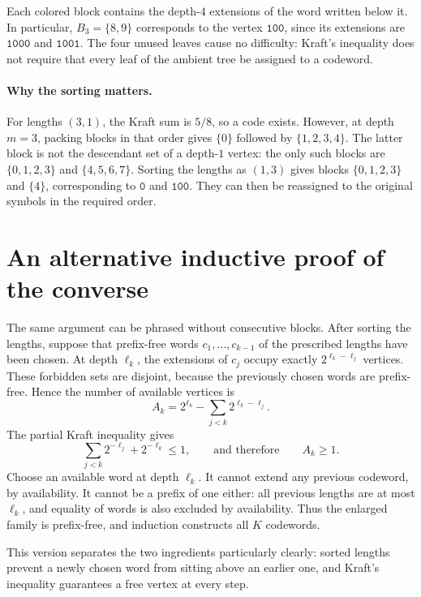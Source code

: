 \documentclass[11pt]{article}
\newcommand{\word}[1]{\texttt{#1}}
\begin{document}
Each colored block contains the depth-$4$ extensions of the word written
below it. In particular, $B_3=\{8,9\}$ corresponds to the vertex
$\word{100}$, since its extensions are $\word{1000}$ and $\word{1001}$.
The four unused leaves cause no difficulty: Kraft's inequality does not
require that every leaf of the ambient tree be assigned to a codeword.

\paragraph{Why the sorting matters.}
For lengths $(3,1)$, the Kraft sum is $5/8$, so a code exists. However, at
depth $m=3$, packing blocks in that order gives $\{0\}$ followed by
$\{1,2,3,4\}$. The latter block is not the descendant set of a depth-$1$
vertex: the only such blocks are $\{0,1,2,3\}$ and $\{4,5,6,7\}$.
Sorting the lengths as $(1,3)$ gives blocks $\{0,1,2,3\}$ and $\{4\}$,
corresponding to $\word{0}$ and $\word{100}$. They can then be reassigned
to the original symbols in the required order.

\section*{An alternative inductive proof of the converse}

The same argument can be phrased without consecutive blocks. After sorting
the lengths, suppose that prefix-free words $c_1,\ldots,c_{k-1}$ of the
prescribed lengths have been chosen. At depth $\ell_k$, the extensions of
$c_j$ occupy exactly $2^{\ell_k-\ell_j}$ vertices. These forbidden sets
are disjoint, because the previously chosen words are prefix-free. Hence
the number of available vertices is
\[
 A_k=2^{\ell_k}-\sum_{j<k}2^{\ell_k-\ell_j}.
\]
The partial Kraft inequality gives
\[
 \sum_{j<k}2^{-\ell_j}+2^{-\ell_k}\leq1,
 \qquad\text{and therefore}\qquad A_k\geq1.
\]
Choose an available word at depth $\ell_k$. It cannot extend any previous
codeword, by availability. It cannot be a prefix of one either: all previous
lengths are at most $\ell_k$, and equality of words is also excluded by
availability. Thus the enlarged family is prefix-free, and induction
constructs all $K$ codewords.

This version separates the two ingredients particularly clearly: sorted
lengths prevent a newly chosen word from sitting above an earlier one,
and Kraft's inequality guarantees a free vertex at every step.
\end{document}
